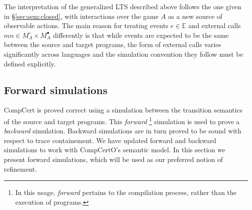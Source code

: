 \documentclass[sigplan,10pt,review,anonymous]{acmart}
\newcommand{\kw}[1]{\ensuremath{ \mathsf{#1} }}
\newcommand{\bind}{\gg\!\!=}
\newcommand{\que}{\circ}
\newcommand{\ans}{\bullet}
\begin{document}
The interpretation of the generalized LTS described above
follows the one given in \S\ref{sec:sem:closed},
with interactions over the game $A$
as a new source of observable actions.
The main reason for treating
events $e \in \mathbb{E}$ and
external calls $m n \in M_A^\que \times M_A^\ans$
differently is that
while events are expected to be the same
between the source and target programs,
the form of external calls varies significantly
across languages
and the simulation convention they follow
must be defined explicitly.




\subsection{Forward simulations} \label{sec:sem:ref} %

CompCert is proved correct using a simulation
between the transition semantics of the source and target programs.
This \emph{forward}%
\footnote{In this usage, \emph{forward} pertains to
  the compilation process,
  rather than the execution of programs.}
simulation is used to prove a \emph{backward} simulation.
Backward simulations
are in turn proved to be sound with respect to trace containement.
We have updated forward and backward simulations to
work with CompCertO's semantic model.
In this section we present forward simulations,
which will be used as our preferred notion of refinement.
\end{document}

